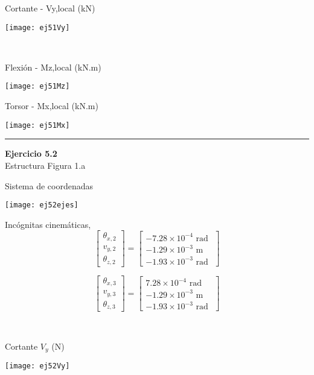 \vspace{5mm}

\begin{minipage}{0.45\textwidth}
Cortante - Vy,local (kN)

\texttt{[image: ej51Vy]}
\end{minipage}
~
\begin{minipage}{0.45\textwidth}
Flexión - Mz,local (kN.m)

\texttt{[image: ej51Mz]}
\end{minipage}


\begin{center}
Torsor - Mx,local (kN.m)

\texttt{[image: ej51Mx]}
\end{center}




\hrule 
\vspace{5mm}
\textbf{Ejercicio 5.2}\\

Estructura Figura 1.a

Sistema de coordenadas
\begin{center}
\texttt{[image: ej52ejes]}
\end{center}


\begin{minipage}{0.45\textwidth}
	Incógnitas cinemáticas,
$$
\left[
\begin{matrix}
\theta_{x,2} \\
v_{y,2} \\
\theta_{z,2}
\end{matrix}
\right]
=
\left[
\begin{matrix}
-7.28\times 10^{-4} \text{ rad }\\
-1.29\times 10^{-3} \text{ m }\\
-1.93\times 10^{-3} \text{ rad }
\end{matrix}
\right]
$$

$$
\left[
\begin{matrix}
\theta_{x,3} \\
v_{y,3} \\
\theta_{z,3}
\end{matrix}
\right]
=
\left[
\begin{matrix}
 7.28\times 10^{-4} \text{ rad }\\
-1.29\times 10^{-3} \text{ m }\\
-1.93\times 10^{-3} \text{ rad }
\end{matrix}
\right]
$$
\end{minipage}
~
\begin{minipage}{0.45\textwidth}
Cortante $V_y$ (N)

\texttt{[image: ej52Vy]}
\end{minipage}


